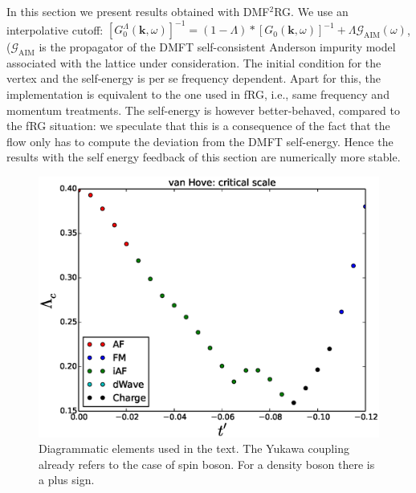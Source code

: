 In this section we present results obtained with DMF$^2$RG.  We use an interpolative cutoff: $[G_0^\Lambda(\mathbf{k},\omega)]^{-1} = (1-\Lambda)*[G_0(\mathbf{k},\omega)]^{-1}+\Lambda \mathcal{G}_{\mathrm{AIM}}(\omega)$, ($\mathcal{G}_{\mathrm{AIM}}$ is the propagator of the DMFT self-consistent Anderson impurity model associated with the lattice under consideration. The initial condition for the vertex and the self-energy is per se frequency dependent. 
Apart for this, the implementation is equivalent to the one used in fRG, i.e., same frequency and momentum treatments. 
The self-energy is however better-behaved, compared to the fRG situation: we speculate that this is a consequence of the fact that the flow only has to compute the deviation from the DMFT self-energy. Hence the results with the self energy feedback of this section are numerically more stable.  


\begin{figure}
\includegraphics[scale=0.5]{vanHove_scan_critical_lambda_phi.eps}
\caption{Diagrammatic elements used in the text. The Yukawa coupling already refers to the case of spin boson. For a density boson there is a plus sign. } \label{dictionary}

\end{figure}
